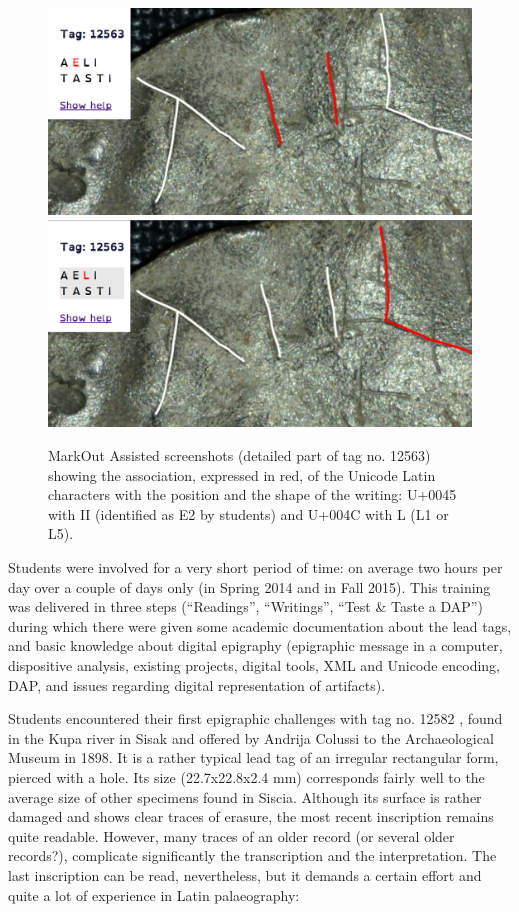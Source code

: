 \documentclass[amsthm,ebook]{saparticle}
\begin{document}
\begin{figure}[!hbp]
\centering
\includegraphics[scale=0.10]{EAGLE16lameetalteaching-img003.png}
\includegraphics[scale=0.10]{EAGLE16lameetalteaching-img004.png}
\caption{MarkOut Assisted screenshots (detailed part of tag no. 12563) showing the association, expressed in red, of the Unicode
Latin characters with the position and the shape of the writing: U+0045 with II (identified as E2 by students) and
U+004C with L (L1 or L5).}
\label{fig:markout}
\end{figure}

Students were involved for a very short period of time: on average two hours per day over a couple of days only (in
Spring 2014 and in Fall 2015). This training was delivered in three steps (``Readings'', ``Writings'', ``Test \& Taste a
DAP'') during which there were given some academic documentation about the lead tags, and basic knowledge about digital
epigraphy (epigraphic message in a computer, dispositive analysis, existing projects, digital tools, XML and Unicode
encoding, DAP, and issues regarding digital representation of artifacts).

Students encountered their first epigraphic challenges with tag no. 12582 \citep[cat 03.13, 347]{radman-livaja_plombs_2014}, found in
the Kupa river in Sisak and offered by Andrija Colussi to the Archaeological Museum in 1898. It is a rather typical
lead tag of an irregular rectangular form, pierced with a hole. Its size (22.7x22.8x2.4 mm) corresponds fairly well to
the average size of other specimens found in Siscia. Although its surface is rather damaged and shows clear traces of
erasure, the most recent inscription remains quite readable. However, many traces of an older record (or several older
records?), complicate significantly the transcription and the interpretation. The last inscription can be read,
nevertheless, but it demands a certain effort and quite a lot of experience in Latin palaeography:
\end{document}
